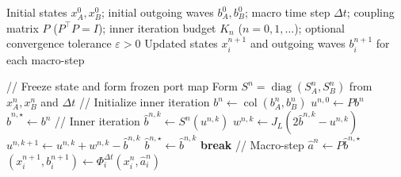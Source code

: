 \begin{algorithm}[t]
\caption{Wave-Domain Douglas-Rachford Iterative Coupling}
\label{alg:scattering_iterative_coupling}
\begin{algorithmic}[1]
\Require Initial states $x_A^0, x_B^0$; initial outgoing waves $b_A^0, b_B^0$; macro time step $\Delta t$; coupling matrix $P$ ($P^\top P = I$); inner iteration budget $K_n$ ($n = 0,1,\dots$); optional convergence tolerance $\varepsilon > 0$
\Ensure Updated states $x_i^{n+1}$ and outgoing waves $b_i^{n+1}$ for each macro-step

    \State // Freeze state and form frozen port map
    \State Form $S^n = \operatorname{diag}(S_A^n, S_B^n)$ from $x_A^n, x_B^n$ and $\Delta t$
    \State // Initialize inner iteration
    \State $b^n \gets \operatorname{col}(b_A^n, b_B^n)$
    \State $u^{n,0} \gets P b^n$
    \State $\hat{b}^{n,\star} \gets b^n$
    \State // Inner iteration
        \State $\hat{b}^{n,k} \gets S^n(u^{n,k})$ 
        \State $w^{n,k} \gets J_L(2\hat{b}^{n,k} - u^{n,k})$ 
        \State $u^{n,k+1} \gets u^{n,k} + w^{n,k} - \hat{b}^{n,k}$
        \State $\hat{b}^{n,\star} \gets \hat{b}^{n,k}$
            \State \textbf{break}
        \EndIf
    \EndFor
    \State // Macro-step
    \State $\hat{a}^n \gets P \hat{b}^{n,\star}$ 
        \State $(x_i^{n+1}, b_i^{n+1}) \gets \Phi_i^{\Delta t}(x_i^n, \hat{a}_i^n)$
    \EndFor
\EndFor
\end{algorithmic}
\end{algorithm}
